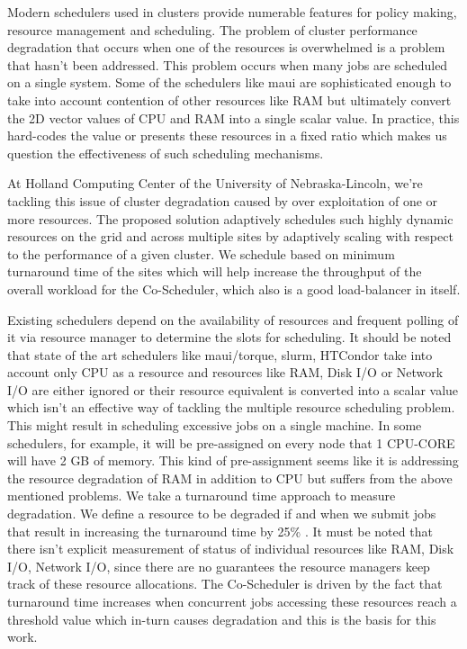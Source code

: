 \documentclass[ms,electronic,double]{nuthesis}
\begin{document}
Modern schedulers used in clusters provide numerable features for policy making, resource management 
and scheduling. The problem of cluster 
performance degradation that occurs when one of the resources is overwhelmed is a problem that hasn't been 
addressed. This problem occurs when many jobs are scheduled on a single system. Some of 
the schedulers like maui \cite{pbstorque} are sophisticated enough to take into account contention of other 
resources like RAM but ultimately convert the 2D vector values of CPU and RAM 
into a single scalar value. In practice, this hard-codes the value or presents these resources
in a fixed ratio which makes us question the effectiveness of such scheduling mechanisms. 

At Holland Computing Center of the University of Nebraska-Lincoln, we're 
tackling this issue of cluster degradation caused by 
over exploitation of one or more resources. 
The proposed solution adaptively schedules 
such highly dynamic resources on the grid and across multiple sites by adaptively scaling with respect to
the performance of a given cluster. We schedule based on minimum turnaround time of the sites which will help increase 
the throughput of the overall workload for the Co-Scheduler, which also is a good load-balancer in itself.

Existing schedulers depend on the availability of resources and frequent polling 
of it via resource manager to determine the slots for scheduling. It should be noted that state of the art 
schedulers like maui/torque, slurm, HTCondor take into account only CPU as a 
resource and resources like RAM, Disk I/O or Network I/O are either ignored or 
their resource equivalent is converted into a scalar value which isn't an effective way of tackling the 
multiple resource scheduling problem. This might result in scheduling excessive jobs 
on a single machine. In some schedulers, for example, it will be pre-assigned on every node that 1 CPU-CORE will have 2 GB of
memory. This kind of pre-assignment seems like it is addressing the resource degradation of RAM in addition to CPU but suffers 
from the above mentioned problems. We take a turnaround time approach to measure degradation. We define a resource 
to be degraded if and when we submit jobs that result in increasing the 
turnaround time by 25\% . It must be 
noted that there isn't explicit measurement of status of individual resources like RAM, Disk I/O, 
Network I/O, since there are no guarantees the resource managers keep track of these resource allocations. 
The Co-Scheduler is driven by the fact that turnaround time increases when 
concurrent jobs accessing these resources reach a threshold value which in-turn causes 
degradation and this is the basis for this work.
\end{document}
